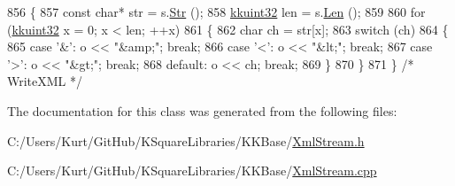 \begin{DoxyCode}
856 \{
857   \textcolor{keyword}{const} \textcolor{keywordtype}{char}*  str = s.\hyperlink{class_k_k_b_1_1_k_k_str_ad574e6c0fe7f6ce1ba3ab0a8ce2fbd52}{Str} ();
858   \hyperlink{namespace_k_k_b_af8d832f05c54994a1cce25bd5743e19a}{kkuint32} len = s.\hyperlink{class_k_k_b_1_1_k_k_str_a869142d4855517c5c237afcb25dbbe36}{Len} ();
859 
860   \textcolor{keywordflow}{for}  (\hyperlink{namespace_k_k_b_af8d832f05c54994a1cce25bd5743e19a}{kkuint32} x = 0;  x < len;  ++x)
861   \{
862     \textcolor{keywordtype}{char} ch = str[x];
863     \textcolor{keywordflow}{switch}  (ch)
864     \{
865     \textcolor{keywordflow}{case}  \textcolor{charliteral}{'&'}:  o << \textcolor{stringliteral}{"&amp;"};  \textcolor{keywordflow}{break};
866     \textcolor{keywordflow}{case}  \textcolor{charliteral}{'<'}:  o << \textcolor{stringliteral}{"&lt;"};   \textcolor{keywordflow}{break};
867     \textcolor{keywordflow}{case}  \textcolor{charliteral}{'>'}:  o << \textcolor{stringliteral}{"&gt;"};   \textcolor{keywordflow}{break};
868     \textcolor{keywordflow}{default}:    o << ch;       \textcolor{keywordflow}{break};
869     \}
870   \}
871 \}  \textcolor{comment}{/* WriteXML */}
\end{DoxyCode}


The documentation for this class was generated from the following files\+:\begin{DoxyCompactItemize}
\item 
C\+:/\+Users/\+Kurt/\+Git\+Hub/\+K\+Square\+Libraries/\+K\+K\+Base/\hyperlink{_xml_stream_8h}{Xml\+Stream.\+h}\item 
C\+:/\+Users/\+Kurt/\+Git\+Hub/\+K\+Square\+Libraries/\+K\+K\+Base/\hyperlink{_xml_stream_8cpp}{Xml\+Stream.\+cpp}\end{DoxyCompactItemize}
